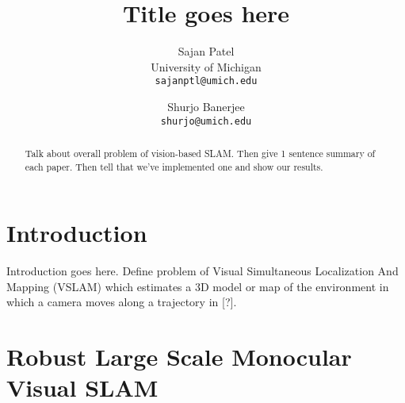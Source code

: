 \documentclass[10pt,twocolumn,letterpaper]{article}
\begin{document}
\title{Title goes here}

\author{Sajan Patel\\
University of Michigan\\
{\tt\small sajanptl@umich.edu}
\and
Shurjo Banerjee\\
{\tt\small shurjo@umich.edu}
}

\maketitle

\begin{abstract}
Talk about overall problem of vision-based SLAM. Then give 1 sentence
summary of each paper. Then tell that we've implemented one and show 
our results.
\end{abstract}

\section{Introduction}

Introduction goes here. Define problem of Visual Simultaneous Localization And Mapping (VSLAM) which estimates a 3D model or map of the environment in which a camera moves along a trajectory in [?].  
\section{Robust Large Scale Monocular Visual SLAM}
\end{document}

